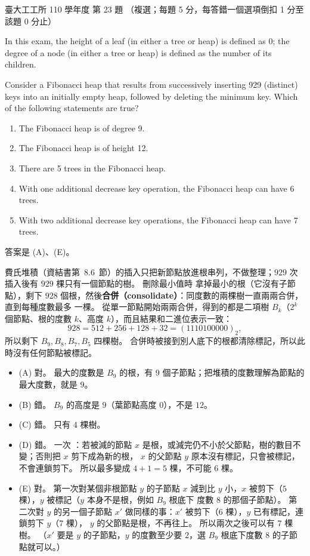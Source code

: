 \begin{pastexam}[label={px:ntu-110-ie-ds-23}]{臺大工工所 110 學年度 第 23 題}
（複選；每題 5 分，每答錯一個選項倒扣 1 分至該題 0 分止）

In this exam, the height of a leaf (in either a tree or heap) is defined as 0; the degree of a node (in
either a tree or heap) is defined as the number of its children.

Consider a Fibonacci heap that results from successively inserting 929 (distinct) keys into an initially
empty heap, followed by deleting the minimum key. Which of the following statements are true?
\begin{enumerate}[label=(\Alph*)]
\item The Fibonacci heap is of degree 9.
\item The Fibonacci heap is of height 12.
\item There are 5 trees in the Fibonacci heap.
\item With one additional decrease key operation, the Fibonacci heap can have 6 trees.
\item With two additional decrease key operations, the Fibonacci heap can have 7 trees.
\end{enumerate}
\end{pastexam}

\begin{pastsoln}
答案是 (A)、(E)。

費氏堆積（資結書第~8.6~節）的插入只把新節點放進根串列，不做整理；$929$ 次插入後有 $929$ 棵只有一個節點的樹。 刪除最小值時
拿掉最小的根（它沒有子節點），剩下 $928$ 個根，然後\textbf{合併（consolidate）}：同度數的兩棵樹一直兩兩合併，直到每種度數最多
一棵。 從單一節點開始兩兩合併，得到的都是二項樹 $B_k$（$2^k$ 個節點、根的度數 $k$、高度 $k$），而且結果和二進位表示一致：
\[
  928 = 512 + 256 + 128 + 32 = (1110100000)_2 ,
\]
所以剩下 $B_9, B_8, B_7, B_5$ 四棵樹。 合併時被接到別人底下的根都清除標記，所以此時沒有任何節點被標記。
\begin{itemize}
\item (A) 對。 最大的度數是 $B_9$ 的根，有 $9$ 個子節點；把堆積的度數理解為節點的最大度數，就是 $9$。
\item (B) 錯。 $B_9$ 的高度是 $9$（葉節點高度 $0$），不是 $12$。
\item (C) 錯。 只有 $4$ 棵樹。
\item (D) 錯。 一次 ：若被減的節點 $x$ 是根，或減完仍不小於父節點，樹的數目不變；否則把 $x$ 剪下成為新的根，
$x$ 的父節點 $y$ 原本沒有標記，只會被標記，不會連鎖剪下。 所以最多變成 $4 + 1 = 5$ 棵，不可能 $6$ 棵。
\item (E) 對。 第一次對某個非根節點 $y$ 的子節點 $x$ 減到比 $y$ 小，$x$ 被剪下（$5$ 棵），$y$ 被標記（$y$ 本身不是根，例如 $B_9$ 根底下
度數 $8$ 的那個子節點）。 第二次對 $y$ 的另一個子節點 $x'$ 做同樣的事：$x'$ 被剪下（$6$ 棵），$y$ 已有標記，連鎖剪下 $y$（$7$ 棵），
$y$ 的父節點是根，不再往上。 所以兩次之後可以有 $7$ 棵樹。 （$x'$ 要是 $y$ 的子節點，$y$ 的度數至少要 $2$，選 $B_9$ 根底下度數
$8$ 的子節點就可以。）
\end{itemize}
\end{pastsoln}
